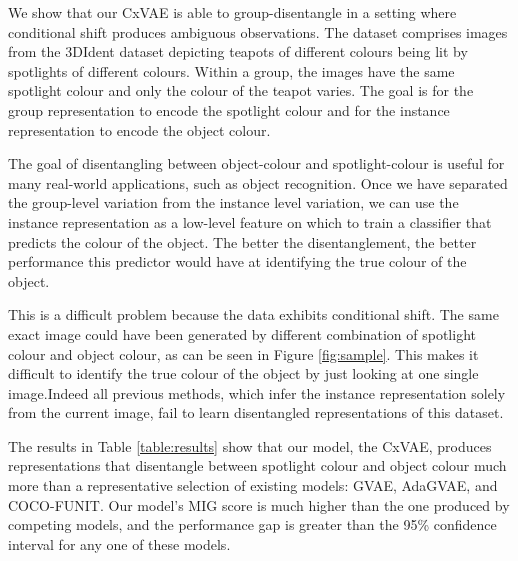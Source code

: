 \documentclass{article} %
\newcommand{\change}[1]{#1}
\begin{document}
\change{We show that our CxVAE is able to group-disentangle in a setting where conditional shift produces ambiguous observations. The dataset comprises images from the 3DIdent dataset \citep{Zimmerman2021Contrastive} depicting teapots of different colours being lit by spotlights of different colours. Within a group, the images have the same spotlight colour and only the colour of the teapot varies.  The goal is for the group representation to encode the spotlight colour and for the instance representation to encode the object colour. }

\change{The goal of disentangling between object-colour and spotlight-colour is useful for many real-world applications, such as object recognition. Once we have separated the group-level variation from the instance level variation, we can use the instance representation as a low-level feature on which to train a classifier that predicts the colour of the object. The better the disentanglement, the better performance this predictor would have at identifying the true colour of the object.}


\change{This is a difficult problem because the data exhibits conditional shift.  The same exact image could have been generated by different combination of spotlight colour and object colour, as can be seen in Figure \ref{fig:sample}.  This makes it difficult to identify the true colour of the object by just looking at one single image.Indeed all previous methods, which infer the instance representation solely from the current image, fail to learn disentangled representations of this dataset.}

\change{The results in Table \ref{table:results} show that our model, the CxVAE, produces representations that disentangle between spotlight colour and object colour much more than a representative selection of existing models: GVAE, AdaGVAE, and COCO-FUNIT. Our model's MIG score is much higher than the one produced by competing models, and the performance gap is greater than the 95\% confidence interval for any one of these models.}
\end{document}
